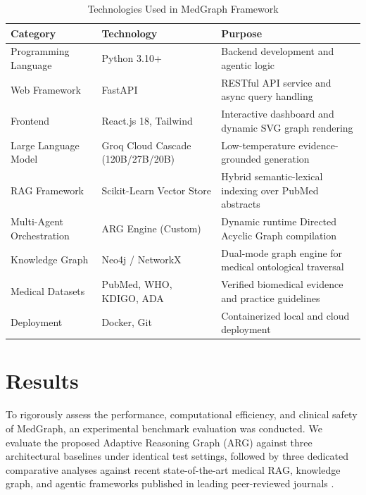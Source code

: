\documentclass[conference]{IEEEtran}
\begin{document}
\begin{table}[htbp]
\centering
\caption{Technologies Used in MedGraph Framework}
\label{tab:technologies_used}
\renewcommand{\arraystretch}{1.2}
\small
\begin{tabularx}{\columnwidth}{|>{\raggedright\arraybackslash}p{2cm}|>{\raggedright\arraybackslash}p{2.2cm}|X|}
\hline
\textbf{Category} & \textbf{Technology} & \textbf{Purpose} \\ \hline
Programming Language & Python 3.10+ & Backend development and agentic logic \\ \hline
Web Framework & FastAPI & RESTful API service and async query handling \\ \hline
Frontend & React.js 18, Tailwind & Interactive dashboard and dynamic SVG graph rendering \\ \hline
Large Language Model & Groq Cloud Cascade (120B/27B/20B) & Low-temperature evidence-grounded generation \\ \hline
RAG Framework & Scikit-Learn Vector Store & Hybrid semantic-lexical indexing over PubMed abstracts \\ \hline
Multi-Agent Orchestration & ARG Engine (Custom) & Dynamic runtime Directed Acyclic Graph compilation \\ \hline
Knowledge Graph & Neo4j / NetworkX & Dual-mode graph engine for medical ontological traversal \\ \hline
Medical Datasets & PubMed, WHO, KDIGO, ADA & Verified biomedical evidence and practice guidelines \\ \hline
Deployment & Docker, Git & Containerized local and cloud deployment \\ \hline
\end{tabularx}
\end{table}

\section{Results}

To rigorously assess the performance, computational efficiency, and clinical safety of MedGraph, an experimental benchmark evaluation was conducted. We evaluate the proposed Adaptive Reasoning Graph (ARG) against three architectural baselines under identical test settings, followed by three dedicated comparative analyses against recent state-of-the-art medical RAG, knowledge graph, and agentic frameworks published in leading peer-reviewed journals \cite{THIRUNAVUKARASU2023,ZAKKA2024,WANG2025100504,info17020133,ai6100240,GARCIACARMONA2025,LAWANNA2026100926,ALKHALAF2024104662,BAO2024102768}.
\end{document}
